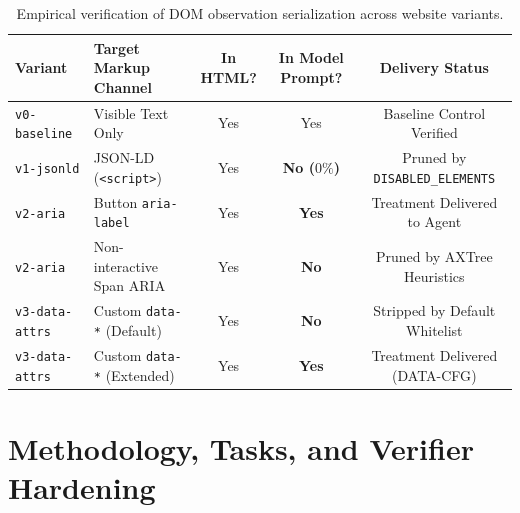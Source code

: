 \documentclass[11pt,a4paper]{article}
\begin{document}
\begin{table}[t]
\centering
\small
\caption{Empirical verification of DOM observation serialization across website variants.}
\label{tab:pipeline_trace}
\begin{tabular}{llccc}
\toprule
\textbf{Variant} & \textbf{Target Markup Channel} & \textbf{In HTML?} & \textbf{In Model Prompt?} & \textbf{Delivery Status} \\
\midrule
\texttt{v0-baseline} & Visible Text Only & Yes & Yes & Baseline Control Verified \\
\texttt{v1-jsonld}   & JSON-LD (\texttt{<script>}) & Yes & \textbf{No ($0\%$)} & Pruned by \texttt{DISABLED\_ELEMENTS} \\
\texttt{v2-aria}     & Button \texttt{aria-label} & Yes & \textbf{Yes} & Treatment Delivered to Agent \\
\texttt{v2-aria}     & Non-interactive Span ARIA & Yes & \textbf{No} & Pruned by AXTree Heuristics \\
\texttt{v3-data-attrs}& Custom \texttt{data-*} (Default) & Yes & \textbf{No} & Stripped by Default Whitelist \\
\texttt{v3-data-attrs}& Custom \texttt{data-*} (Extended)& Yes & \textbf{Yes} & Treatment Delivered (\textsc{DATA-CFG}) \\
\bottomrule
\end{tabular}
\end{table}

\section{Methodology, Tasks, and Verifier Hardening}
\label{sec:methodology}
\end{document}
